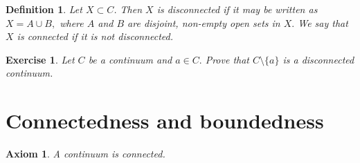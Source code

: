\documentclass{amsart}
\newtheorem{axiom}[theorem]{Axiom}
\newtheorem{definition}[theorem]{Definition}
\newtheorem{exercise}[theorem]{Exercise}
\newcommand{\1}{\mathds{1}}
\numberwithin{equation}{section}
\numberwithin{theorem}{section}
\begin{document}
%
%
%
%
%
%
%
%
%


\begin{definition}
Let $X\subset C$. Then $X$ is {\it disconnected} if it may be written as $X=A\cup B,$ where $A$ and $B$ are disjoint, non-empty open sets in $X.$  We say that $X$ is {\it connected} if it is not disconnected.
\end{definition} 


\begin{exercise} Let $C$ be a continuum and $a\in C.$ Prove that $C\setminus\{a\}$ is a disconnected continuum.
\end{exercise} 



\section{Connectedness and boundedness}


\begin{axiom}
A continuum is connected.
\end{axiom}
\end{document}
